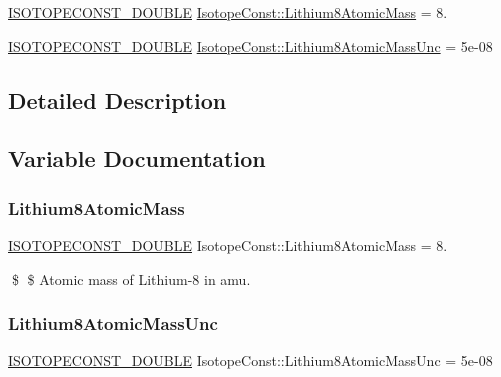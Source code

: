 \begin{DoxyCompactItemize}
\item 
\mbox{\hyperlink{group___isotope_const-_macros_ga8f45a7272ce02c0b4c65c44636ed719a}{I\+S\+O\+T\+O\+P\+E\+C\+O\+N\+S\+T\+\_\+\+D\+O\+U\+B\+LE}} \mbox{\hyperlink{group___isotope_const-_lithium-_li8_ga5dcd61f7ec20a9b4501be9235501d5f8}{Isotope\+Const\+::\+Lithium8\+Atomic\+Mass}} = 8.
\item 
\mbox{\hyperlink{group___isotope_const-_macros_ga8f45a7272ce02c0b4c65c44636ed719a}{I\+S\+O\+T\+O\+P\+E\+C\+O\+N\+S\+T\+\_\+\+D\+O\+U\+B\+LE}} \mbox{\hyperlink{group___isotope_const-_lithium-_li8_ga74768c423edfe93f087d8f6081986f11}{Isotope\+Const\+::\+Lithium8\+Atomic\+Mass\+Unc}} = 5e-\/08
\end{DoxyCompactItemize}


\subsection{Detailed Description}


\subsection{Variable Documentation}
\mbox{\label{group___isotope_const-_lithium-_li8_ga5dcd61f7ec20a9b4501be9235501d5f8}} 
\subsubsection{\texorpdfstring{Lithium8\+Atomic\+Mass}{Lithium8AtomicMass}}
{\footnotesize\ttfamily \mbox{\hyperlink{group___isotope_const-_macros_ga8f45a7272ce02c0b4c65c44636ed719a}{I\+S\+O\+T\+O\+P\+E\+C\+O\+N\+S\+T\+\_\+\+D\+O\+U\+B\+LE}} Isotope\+Const\+::\+Lithium8\+Atomic\+Mass = 8.}

\$ \$ Atomic mass of Lithium-\/8 in amu. \mbox{\label{group___isotope_const-_lithium-_li8_ga74768c423edfe93f087d8f6081986f11}} 
\subsubsection{\texorpdfstring{Lithium8\+Atomic\+Mass\+Unc}{Lithium8AtomicMassUnc}}
{\footnotesize\ttfamily \mbox{\hyperlink{group___isotope_const-_macros_ga8f45a7272ce02c0b4c65c44636ed719a}{I\+S\+O\+T\+O\+P\+E\+C\+O\+N\+S\+T\+\_\+\+D\+O\+U\+B\+LE}} Isotope\+Const\+::\+Lithium8\+Atomic\+Mass\+Unc = 5e-\/08}

